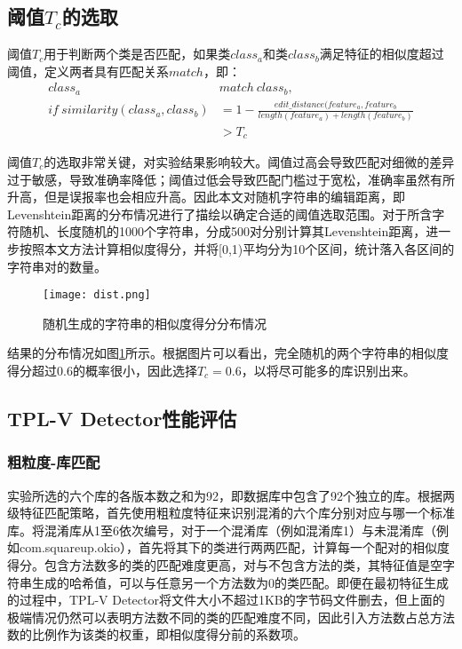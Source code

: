 \subsection{阈值$T_c$的选取}
阈值$T_c$用于判断两个类是否匹配，如果类$class_a$和类$class_b$满足特征的相似度超过阈值，定义两者具有匹配关系$match$，即：
\begin{equation}
\begin{aligned}
class_a\ &match\ class_b,\\
if\ similarity(class_a,class_b)&=1-\frac{edit\_distance(feature_{a},feature_{b}}{length(feature_a)+length(feature_b)}\\
&> T_c
\end{aligned}
\end{equation}

阈值$T_c$的选取非常关键，对实验结果影响较大。阈值过高会导致匹配对细微的差异过于敏感，导致准确率降低；阈值过低会导致匹配门槛过于宽松，准确率虽然有所升高，但是误报率也会相应升高。因此本文对随机字符串的编辑距离，即Levenshtein距离的分布情况进行了描绘以确定合适的阈值选取范围。对于所含字符随机、长度随机的1000个字符串，分成500对分别计算其Levenshtein距离，进一步按照本文方法计算相似度得分，并将[0,1)平均分为10个区间，统计落入各区间的字符串对的数量。

\begin{figure}[!htp]
  \centering
  \texttt{[image: dist.png]} \\
  \caption{随机生成的字符串的相似度得分分布情况}
 \label{fig:distribution}
\end{figure}


结果的分布情况如图\ref{fig:distribution}所示。根据图片可以看出，完全随机的两个字符串的相似度得分超过0.6的概率很小，因此选择$T_c=0.6$，以将尽可能多的库识别出来。

\subsection{TPL-V Detector性能评估}

\subsubsection{粗粒度-库匹配}
实验所选的六个库的各版本数之和为92，即数据库中包含了92个独立的库。根据两级特征匹配策略，首先使用粗粒度特征来识别混淆的六个库分别对应与哪一个标准库。将混淆库从1至6依次编号，对于一个混淆库（例如混淆库1）与未混淆库（例如com.squareup.okio），首先将其下的类进行两两匹配，计算每一个配对的相似度得分。包含方法数多的类的匹配难度更高，对与不包含方法的类，其特征值是空字符串生成的哈希值，可以与任意另一个方法数为0的类匹配。即便在最初特征生成的过程中，TPL-V Detector将文件大小不超过1KB的字节码文件删去，但上面的极端情况仍然可以表明方法数不同的类的匹配难度不同，因此引入方法数占总方法数的比例作为该类的权重，即相似度得分前的系数项。

